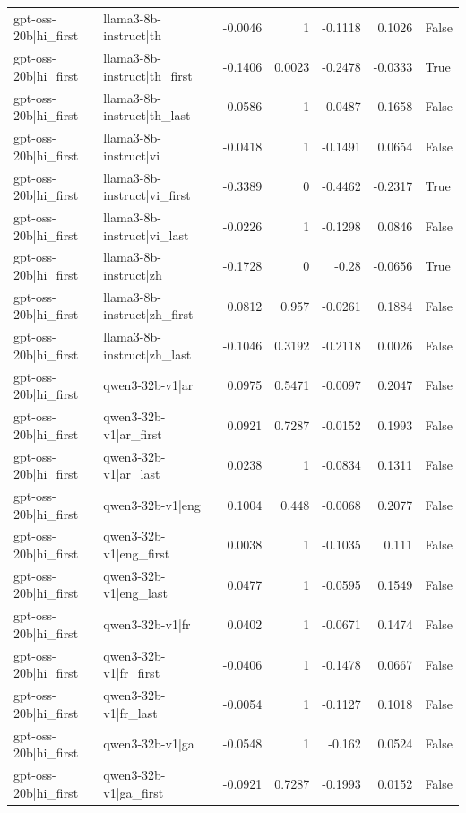 \begin{table}
\begin{tabular}{l l r r r r l}
gpt-oss-20b|hi_first & llama3-8b-instruct|th & -0.0046 & 1 & -0.1118 & 0.1026 & False \\
gpt-oss-20b|hi_first & llama3-8b-instruct|th_first & -0.1406 & 0.0023 & -0.2478 & -0.0333 & True \\
gpt-oss-20b|hi_first & llama3-8b-instruct|th_last & 0.0586 & 1 & -0.0487 & 0.1658 & False \\
gpt-oss-20b|hi_first & llama3-8b-instruct|vi & -0.0418 & 1 & -0.1491 & 0.0654 & False \\
gpt-oss-20b|hi_first & llama3-8b-instruct|vi_first & -0.3389 & 0 & -0.4462 & -0.2317 & True \\
gpt-oss-20b|hi_first & llama3-8b-instruct|vi_last & -0.0226 & 1 & -0.1298 & 0.0846 & False \\
gpt-oss-20b|hi_first & llama3-8b-instruct|zh & -0.1728 & 0 & -0.28 & -0.0656 & True \\
gpt-oss-20b|hi_first & llama3-8b-instruct|zh_first & 0.0812 & 0.957 & -0.0261 & 0.1884 & False \\
gpt-oss-20b|hi_first & llama3-8b-instruct|zh_last & -0.1046 & 0.3192 & -0.2118 & 0.0026 & False \\
gpt-oss-20b|hi_first & qwen3-32b-v1|ar & 0.0975 & 0.5471 & -0.0097 & 0.2047 & False \\
gpt-oss-20b|hi_first & qwen3-32b-v1|ar_first & 0.0921 & 0.7287 & -0.0152 & 0.1993 & False \\
gpt-oss-20b|hi_first & qwen3-32b-v1|ar_last & 0.0238 & 1 & -0.0834 & 0.1311 & False \\
gpt-oss-20b|hi_first & qwen3-32b-v1|eng & 0.1004 & 0.448 & -0.0068 & 0.2077 & False \\
gpt-oss-20b|hi_first & qwen3-32b-v1|eng_first & 0.0038 & 1 & -0.1035 & 0.111 & False \\
gpt-oss-20b|hi_first & qwen3-32b-v1|eng_last & 0.0477 & 1 & -0.0595 & 0.1549 & False \\
gpt-oss-20b|hi_first & qwen3-32b-v1|fr & 0.0402 & 1 & -0.0671 & 0.1474 & False \\
gpt-oss-20b|hi_first & qwen3-32b-v1|fr_first & -0.0406 & 1 & -0.1478 & 0.0667 & False \\
gpt-oss-20b|hi_first & qwen3-32b-v1|fr_last & -0.0054 & 1 & -0.1127 & 0.1018 & False \\
gpt-oss-20b|hi_first & qwen3-32b-v1|ga & -0.0548 & 1 & -0.162 & 0.0524 & False \\
gpt-oss-20b|hi_first & qwen3-32b-v1|ga_first & -0.0921 & 0.7287 & -0.1993 & 0.0152 & False \\

\end{tabular}
\end{table}
